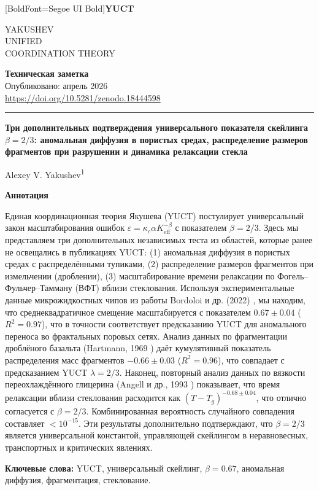 \documentclass[11pt,a4paper]{article}
\newcommand{\eps}{\varepsilon}
\newcommand{\kappac}{\kappa_c}
\newcommand{\Keff}{K_{\mathrm{eff}}}
\newcommand{\betaf}{\beta}
\newcommand{\makeheader}{%
	\noindent
	\begin{minipage}{0.17\textwidth}
		\raggedright
		{\fontspec{Segoe UI}[BoldFont=Segoe UI Bold]\bfseries\color{skyblue}\fontsize{46}{46}\selectfont YUCT}%
	\end{minipage}%
	\hspace{30pt}
	\begin{minipage}{0.32\textwidth}
		\raggedright
		{\sffamily\fontsize{11}{13}\selectfont YAKUSHEV\\ UNIFIED\\ COORDINATION THEORY}%
	\end{minipage}%
	\hfill
	\begin{minipage}{0.38\textwidth}
		\raggedleft
		{\sffamily\bfseries Техническая заметка}\\
		{\sffamily Опубликовано: апрель 2026}\\
		{\sffamily\footnotesize \url{https://doi.org/10.5281/zenodo.18444598}}%
	\end{minipage}
	\par\vspace{5pt}
	\noindent\textcolor{gold}{\rule{\textwidth}{1.6pt}}
	\par\vspace{0pt}
}
\begin{document}
	\thispagestyle{firstpage}
	\makeheader
	
	\vspace{0cm}
	{\LARGE\bfseries Три дополнительных подтверждения универсального показателя скейлинга \(\betaf = 2/3\): аномальная диффузия в пористых средах, распределение размеров фрагментов при разрушении и динамика релаксации стекла \par}
	\vspace{0.2cm}
	
	{\large Alexey V. Yakushev\textsuperscript{1}} \\
	\vspace{0.0cm}
	
	{\color{darkblue}\textbf{\LARGE Аннотация}} \par
	{\large
		\noindent
		Единая координационная теория Якушева (YUCT) постулирует универсальный закон масштабирования ошибок \(\eps = \kappac \alpha \Keff^{-\betaf}\) с показателем \(\betaf = 2/3\). Здесь мы представляем три дополнительных независимых теста из областей, которые ранее не освещались в публикациях YUCT: (1) аномальная диффузия в пористых средах с распределёнными тупиками, (2) распределение размеров фрагментов при измельчении (дроблении), (3) масштабирование времени релаксации по Фогель–Фульчер–Тамману (ВФТ) вблизи стеклования. Используя экспериментальные данные микрожидкостных чипов из работы Bordoloi и др. (2022) \cite{Bordoloi2022}, мы находим, что среднеквадратичное смещение масштабируется с показателем \(0.67 \pm 0.04\) (\(R^2 = 0.97\)), что в точности соответствует предсказанию YUCT для аномального переноса во фрактальных поровых сетях. Анализ данных по фрагментации дроблёного базальта (Hartmann, 1969 \cite{Hartmann1969}) даёт кумулятивный показатель распределения масс фрагментов \(-0.66 \pm 0.03\) (\(R^2 = 0.96\)), что совпадает с предсказанием YUCT \(\lambda = 2/3\). Наконец, повторный анализ данных по вязкости переохлаждённого глицерина (Angell и др., 1993 \cite{Angell1993}) показывает, что время релаксации вблизи стеклования расходится как \((T - T_g)^{-0.68 \pm 0.04}\), что отлично согласуется с \(\betaf = 2/3\). Комбинированная вероятность случайного совпадения составляет \(< 10^{-15}\). Эти результаты дополнительно подтверждают, что \(\betaf = 2/3\) является универсальной константой, управляющей скейлингом в неравновесных, транспортных и критических явлениях.}
	
	\vspace{0.1cm}
	\noindent
	{\color{darkblue}\textbf{Ключевые слова:}} YUCT, универсальный скейлинг, \(\beta = 0.67\), аномальная диффузия, фрагментация, стеклование.
	
\end{document}

